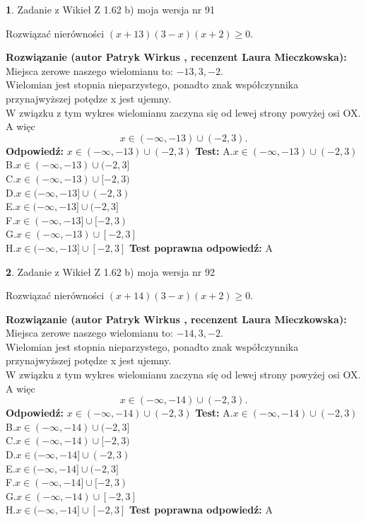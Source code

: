 \documentclass[12pt, a4paper]{article}
\theoremstyle{definition} %
\newtheorem{zad}{}
\newcommand{\zadStart}[1]{\begin{zad}#1\newline}
\newcommand{\zadStop}{\end{zad}}
\newcommand{\rozwStart}[2]{\noindent \textbf{Rozwiązanie (autor #1 , recenzent #2): }\newline}
\newcommand{\rozwStop}{\newline}
\newcommand{\odpStart}{\noindent \textbf{Odpowiedź:}\newline}
\newcommand{\odpStop}{\newline}
\newcommand{\testStart}{\noindent \textbf{Test:}\newline}
\newcommand{\testStop}{\newline}
\newcommand{\kluczStart}{\noindent \textbf{Test poprawna odpowiedź:}\newline}
\newcommand{\kluczStop}{\newline}
\begin{document}
\zadStart{Zadanie z Wikieł Z 1.62 b) moja wersja nr 91}

Rozwiązać nierówności $(x+13)(3-x)(x+2)\ge0$.
\zadStop
\rozwStart{Patryk Wirkus}{Laura Mieczkowska}
Miejsca zerowe naszego wielomianu to: $-13, 3, -2$.\\
Wielomian jest stopnia nieparzystego, ponadto znak współczynnika przy\linebreak najwyższej potędze x jest ujemny.\\ W związku z tym wykres wielomianu zaczyna się od lewej strony powyżej osi OX. A więc $$x \in (-\infty,-13) \cup (-2,3).$$
\rozwStop
\odpStart
$x \in (-\infty,-13) \cup (-2,3)$
\odpStop
\testStart
A.$x \in (-\infty,-13) \cup (-2,3)$\\
B.$x \in (-\infty,-13) \cup (-2,3]$\\
C.$x \in (-\infty,-13) \cup [-2,3)$\\
D.$x \in (-\infty,-13] \cup (-2,3)$\\
E.$x \in (-\infty,-13] \cup (-2,3]$\\
F.$x \in (-\infty,-13] \cup [-2,3)$\\
G.$x \in (-\infty,-13) \cup [-2,3]$\\
H.$x \in (-\infty,-13] \cup [-2,3]$
\testStop
\kluczStart
A
\kluczStop



\zadStart{Zadanie z Wikieł Z 1.62 b) moja wersja nr 92}

Rozwiązać nierówności $(x+14)(3-x)(x+2)\ge0$.
\zadStop
\rozwStart{Patryk Wirkus}{Laura Mieczkowska}
Miejsca zerowe naszego wielomianu to: $-14, 3, -2$.\\
Wielomian jest stopnia nieparzystego, ponadto znak współczynnika przy\linebreak najwyższej potędze x jest ujemny.\\ W związku z tym wykres wielomianu zaczyna się od lewej strony powyżej osi OX. A więc $$x \in (-\infty,-14) \cup (-2,3).$$
\rozwStop
\odpStart
$x \in (-\infty,-14) \cup (-2,3)$
\odpStop
\testStart
A.$x \in (-\infty,-14) \cup (-2,3)$\\
B.$x \in (-\infty,-14) \cup (-2,3]$\\
C.$x \in (-\infty,-14) \cup [-2,3)$\\
D.$x \in (-\infty,-14] \cup (-2,3)$\\
E.$x \in (-\infty,-14] \cup (-2,3]$\\
F.$x \in (-\infty,-14] \cup [-2,3)$\\
G.$x \in (-\infty,-14) \cup [-2,3]$\\
H.$x \in (-\infty,-14] \cup [-2,3]$
\testStop
\kluczStart
A
\kluczStop
\end{document}
